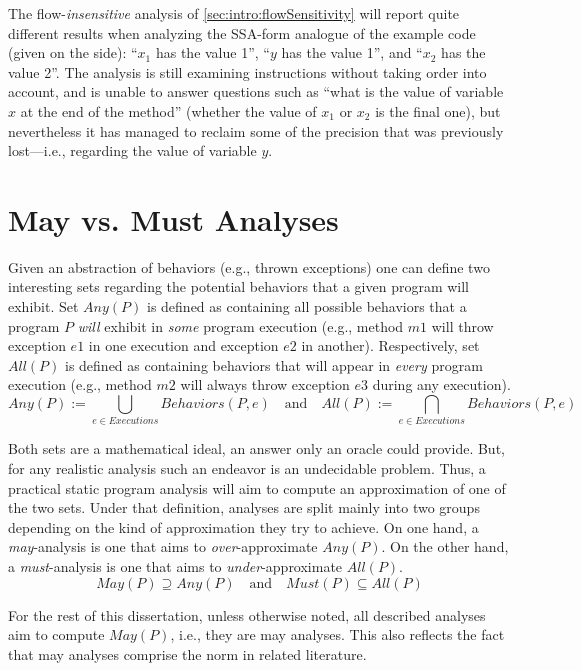 The flow-\emph{insensitive} analysis of \ref{sec:intro:flowSensitivity} will report quite different results when analyzing the SSA-form analogue of the example code (given on the side): ``$x_1$ has the value 1'', ``$y$ has the value 1'', and ``$x_2$ has the value 2''. The analysis is still examining instructions without taking order into account, and is unable to answer questions such as ``what is the value of variable $x$ at the end of the method'' (whether the value of $x_1$ or $x_2$ is the final one), but nevertheless it has managed to reclaim some of the precision that was previously lost---i.e., regarding the value of variable $y$.


\section{May vs. Must Analyses}
\label{sec:intro:may-must}

Given an abstraction of behaviors (e.g., thrown exceptions) one can define two interesting sets regarding the potential behaviors that a given program will exhibit. Set $Any(P)$ is defined as containing all possible behaviors that a program $P$ \emph{will} exhibit in \emph{some} program execution (e.g., method $m1$ will throw exception $e1$ in one execution and exception $e2$ in another). Respectively, set $All(P)$ is defined as containing behaviors that will appear in \emph{every} program execution (e.g., method $m2$ will always throw exception $e3$ during any execution).
\[
Any(P) := \bigcup_{e \in Executions} Behaviors(P, e)
\quad \textrm{and} \quad
All(P) := \bigcap_{e \in Executions} Behaviors(P, e)
\]

Both sets are a mathematical ideal, an answer only an oracle could provide. But, for any realistic analysis such an endeavor is an undecidable problem. Thus, a practical static program analysis will aim to compute an approximation of one of the two sets. Under that definition, analyses are split mainly into two groups depending on the kind of approximation they try to achieve. On one hand, a \emph{may}-analysis is one that aims to \emph{over}-approximate $Any(P)$. On the other hand, a \emph{must}-analysis is one that aims to \emph{under}-approximate $All(P)$.
\[
May(P) \supseteq Any(P) \quad \textrm{and} \quad Must(P) \subseteq All(P)
\]

For the rest of this dissertation, unless otherwise noted, all described analyses aim to compute $May(P)$, i.e., they are may analyses. This also reflects the fact that may analyses comprise the norm in related literature.


